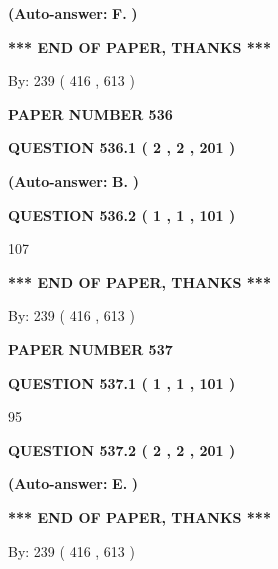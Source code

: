 \documentclass[12pt]{article}
\begin{document}
 
{\textbf{(Auto-answer:}}
{\textbf{\large{
F.}}}
{\textbf{)}}
 
 
   
   
   
   
\vspace{1.0in} 
{\textbf{\large{ *** END OF PAPER, THANKS *** }}} 
   
   
\hspace{1.0in} By: 
 239 ( 416 ,  613 )
   
   
   
   
\newpage 
\setcounter{page}{ 
   536001 } 
   
   
 {\textbf{ \Large{ PAPER NUMBER  536  }}}
   
   
   
   
  
  
{\textbf{\large{QUESTION
536.1 
 ( 2 , 2 , 201 )
}}}
 
 
{\textbf{(Auto-answer:}}
{\textbf{\large{
B.}}}
{\textbf{)}}
 
 
  
  
{\textbf{\large{QUESTION
536.2 
 ( 1 , 1 , 101 )
}}}

107
   
   
   
   
\vspace{1.0in} 
{\textbf{\large{ *** END OF PAPER, THANKS *** }}} 
   
   
\hspace{1.0in} By: 
 239 ( 416 ,  613 )
   
   
   
   
\newpage 
\setcounter{page}{ 
   537001 } 
   
   
 {\textbf{ \Large{ PAPER NUMBER  537  }}}
   
   
   
   
  
  
{\textbf{\large{QUESTION
537.1 
 ( 1 , 1 , 101 )
}}}

95
  
  
{\textbf{\large{QUESTION
537.2 
 ( 2 , 2 , 201 )
}}}
 
 
{\textbf{(Auto-answer:}}
{\textbf{\large{
E.}}}
{\textbf{)}}
 
 
   
   
   
   
\vspace{1.0in} 
{\textbf{\large{ *** END OF PAPER, THANKS *** }}} 
   
   
\hspace{1.0in} By: 
 239 ( 416 ,  613 )
   
   
   
\end{document}
